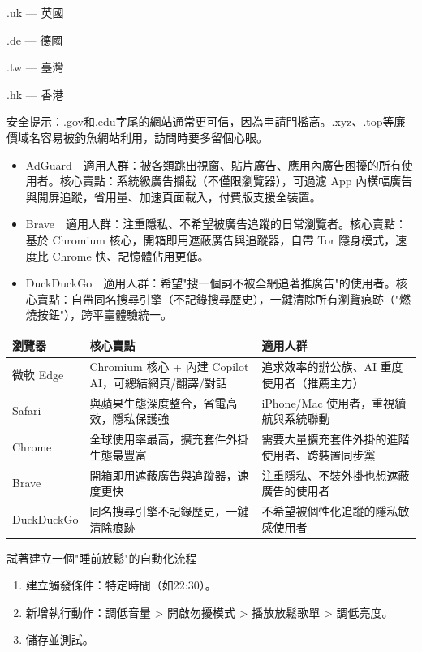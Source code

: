 .uk — 英國

.de — 德國

.tw — 臺灣

.hk — 香港

安全提示：.gov和.edu字尾的網站通常更可信，因為申請門檻高。.xyz、.top等廉價域名容易被釣魚網站利用，訪問時要多留個心眼。


\begin{itemize}
  \item AdGuard　適用人群：被各類跳出視窗、貼片廣告、應用內廣告困擾的所有使用者。核心賣點：系統級廣告攔截（不僅限瀏覽器），可過濾 App 內橫幅廣告與開屏追蹤，省用量、加速頁面載入，付費版支援全裝置。
\end{itemize}


\begin{itemize}
  \item Brave　適用人群：注重隱私、不希望被廣告追蹤的日常瀏覽者。核心賣點：基於 Chromium 核心，開箱即用遮蔽廣告與追蹤器，自帶 Tor 隱身模式，速度比 Chrome 快、記憶體佔用更低。
  \item DuckDuckGo　適用人群：希望"搜一個詞不被全網追著推廣告"的使用者。核心賣點：自帶同名搜尋引擎（不記錄搜尋歷史），一鍵清除所有瀏覽痕跡（"燃燒按鈕"），跨平臺體驗統一。
\end{itemize}


\begin{center}
\begin{tabularx}{\linewidth}{|X|X|X|}
\hline
\textbf{瀏覽器} & \textbf{核心賣點} & \textbf{適用人群} \tabularnewline
\hline
微軟 Edge & Chromium 核心 + 內建 Copilot AI，可總結網頁/翻譯/對話 & 追求效率的辦公族、AI 重度使用者（推薦主力） \tabularnewline
Safari & 與蘋果生態深度整合，省電高效，隱私保護強 & iPhone/Mac 使用者，重視續航與系統聯動 \tabularnewline
Chrome & 全球使用率最高，擴充套件外掛生態最豐富 & 需要大量擴充套件外掛的進階使用者、跨裝置同步黨 \tabularnewline
Brave & 開箱即用遮蔽廣告與追蹤器，速度更快 & 注重隱私、不裝外掛也想遮蔽廣告的使用者 \tabularnewline
DuckDuckGo & 同名搜尋引擎不記錄歷史，一鍵清除痕跡 & 不希望被個性化追蹤的隱私敏感使用者 \tabularnewline
\hline
\end{tabularx}
\end{center}

\begin{tcbpractice}{試著建立一個"睡前放鬆"的自動化流程}
\begin{enumerate}
  \item 建立觸發條件：特定時間（如22:30）。
  \item 新增執行動作：調低音量 > 開啟勿擾模式 > 播放放鬆歌單 > 調低亮度。
  \item 儲存並測試。
\end{enumerate}

\end{tcbpractice}

